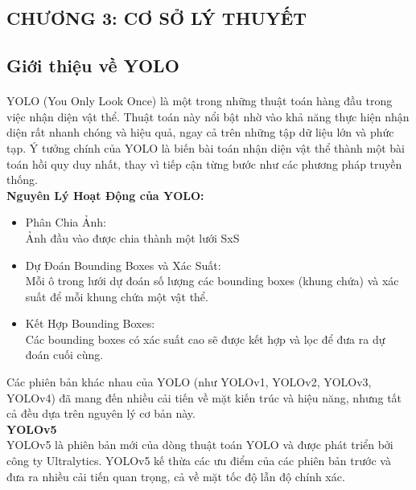 \begin{flushleft}
    \fontsize{16}{20}\selectfont
    \section*{CHƯƠNG 3: CƠ SỞ LÝ THUYẾT}
    \fontsize{13}{20}\selectfont
    \setcounter{section}{3}
    \setcounter{subsection}{0}
    \subsection{Giới thiệu về YOLO}
    \fontsize{13}{20}\selectfont\paragraph{}
    YOLO (You Only Look Once) là một trong những thuật toán hàng đầu trong việc nhận diện vật thể. Thuật toán này nổi bật nhờ vào khả năng thực hiện nhận diện rất nhanh chóng và hiệu quả, ngay cả trên những tập dữ liệu lớn và phức tạp. Ý tưởng chính của YOLO là biến bài toán nhận diện vật thể thành một bài toán hồi quy duy nhất, thay vì tiếp cận từng bước như các phương pháp truyền thống.\\
    \textbf{Nguyên Lý Hoạt Động của YOLO:}\\
    \begin{itemize}
            \item Phân Chia Ảnh: \\Ảnh đầu vào được chia thành một lưới SxS
            \item Dự Đoán Bounding Boxes và Xác Suất:\\Mỗi ô trong lưới dự đoán số lượng các bounding boxes (khung chứa) và xác suất để mỗi khung chứa một vật thể.
            \item Kết Hợp Bounding Boxes: \\Các bounding boxes có xác suất cao sẽ được kết hợp và lọc để đưa ra dự đoán cuối cùng.
    \end{itemize}
    Các phiên bản khác nhau của YOLO (như YOLOv1, YOLOv2, YOLOv3, YOLOv4) đã mang đến nhiều cải tiến về mặt kiến trúc và hiệu năng, nhưng tất cả đều dựa trên nguyên lý cơ bản này.\\
    \textbf{YOLOv5}\\
    YOLOv5 là phiên bản mới của dòng thuật toán YOLO và được phát triển bởi công ty Ultralytics. YOLOv5 kế thừa các ưu điểm của các phiên bản trước và đưa ra nhiều cải tiến quan trọng, cả về mặt tốc độ lẫn độ chính xác.\\

\end{flushleft}
